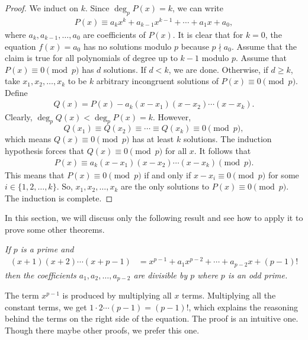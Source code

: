 \documentclass[12pt]{subfile}
\begin{document}
		\begin{proof}
			We induct on $k$. Since $\deg_p P(x) = k$, we can write
				\begin{align*}
				P(x) \equiv a_kx^k + a_{k-1}x^{k-1} + \cdots + a_1 x +a_0,
				\end{align*}
			where $a_k, a_{k-1}, \ldots, a_0$ are coefficients of $P(x)$. It is clear that for $k=0$, the equation $f(x)=a_0$ has no solutions modulo $p$ because $p \nmid a_0$. Assume that the claim is true for all polynomials of degree up to $k-1$ modulo $p$. Assume that $P(x) \equiv 0 \pmod p$ has $d$ solutions. If $d < k$, we are done. Otherwise, if $d\geq k$, take $x_1, x_2, \ldots, x_k$ to be $k$ arbitrary incongruent solutions of $P(x) \equiv 0 \pmod p$. Define
				\begin{align*}
					Q(x) = P(x) - a_k(x-x_1)(x-x_2)\cdots (x-x_k).
				\end{align*}
			Clearly, $\deg_p Q(x) < \deg_p P(x)=k$. However, $$Q(x_1) \equiv Q(x_2) \equiv \cdots \equiv Q(x_k) \equiv 0 \pmod p,$$ which means $Q(x) \equiv 0 \pmod p$ has at least $k$ solutions. The induction hypothesis forces that $Q(x) \equiv 0 \pmod p$ for all $x$. It follows that
				\begin{align*}
					P(x) \equiv a_k(x-x_1)(x-x_2)\cdots (x-x_k) \pmod p.
				\end{align*}
			This means that $P(x) \equiv 0 \pmod p$ if and only if $x-x_i \equiv 0 \pmod p$ for some $i \in \{1,2,\ldots, k\}$. So, $x_1, x_2, \ldots, x_k$ are the only solutions to $P(x) \equiv 0 \pmod p$. The induction is complete.
		\end{proof}
		
		
	In this section, we will discuss only the following result and see how to apply it to prove some other theorems.
		\begin{theorem}[Lagrange]\slshape
			If $p$ is a prime and\label{thm:lag2}
				\begin{align}\label{eq:lagrangeproof0}
					(x+1)(x+2)\cdots(x+p-1) & = x^{p-1}+a_1x^{p-2}+\cdots+a_{p-2}x+(p-1)!
				\end{align}
			then the coefficients $a_1,a_2, \ldots,a_{p-2}$ are divisible by $p$ where $p$ is an odd prime.
		\end{theorem}

	The term $x^{p-1}$ is produced by multiplying all $x$ terms. Multiplying all the constant terms, we get $1\cdot2\cdots(p-1)=(p-1)!$, which explains the reasoning behind the terms on the right side of the equation. The proof is an intuitive one. Though there maybe other proofs, we prefer this one.
	
\end{document}
